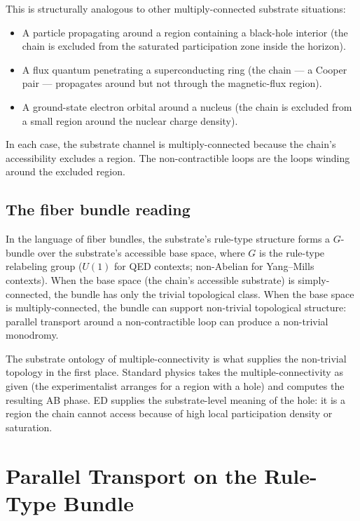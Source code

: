 \documentclass[11pt,a4paper]{article}
\begin{document}
This is structurally analogous to other multiply-connected substrate situations:

\begin{itemize}[noitemsep]
  \item A particle propagating around a region containing a black-hole interior (the chain is excluded from the saturated participation zone inside the horizon).
  \item A flux quantum penetrating a superconducting ring (the chain --- a Cooper pair --- propagates around but not through the magnetic-flux region).
  \item A ground-state electron orbital around a nucleus (the chain is excluded from a small region around the nuclear charge density).
\end{itemize}

In each case, the substrate channel is multiply-connected because the chain's accessibility excludes a region. The non-contractible loops are the loops winding around the excluded region.

\subsection{The fiber bundle reading}

In the language of fiber bundles, the substrate's rule-type structure forms a $G$-bundle over the substrate's accessible base space, where $G$ is the rule-type relabeling group ($U(1)$ for QED contexts; non-Abelian for Yang--Mills contexts). When the base space (the chain's accessible substrate) is simply-connected, the bundle has only the trivial topological class. When the base space is multiply-connected, the bundle can support non-trivial topological structure: parallel transport around a non-contractible loop can produce a non-trivial monodromy.

The substrate ontology of multiple-connectivity is what supplies the non-trivial topology in the first place. Standard physics takes the multiple-connectivity as given (the experimentalist arranges for a region with a hole) and computes the resulting AB phase. ED supplies the substrate-level meaning of the hole: it is a region the chain cannot access because of high local participation density or saturation.

\section{Parallel Transport on the Rule-Type Bundle}
\end{document}
